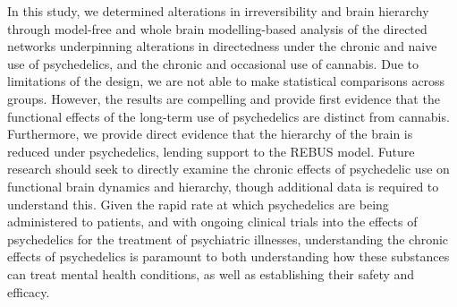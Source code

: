 In this study, we determined alterations
in irreversibility and brain hierarchy through
model-free and whole brain modelling-based analysis of the directed networks underpinning
alterations in directedness under the chronic and naive use of psychedelics, and the chronic and occasional use of cannabis. Due to limitations of the design, we are not able to make statistical comparisons across groups. However, the results
are compelling and provide first evidence
that the functional effects of the long-term
use of psychedelics are distinct from cannabis. Furthermore, we provide direct evidence that the hierarchy of the brain is reduced under psychedelics, lending support to the REBUS model. Future research should seek to directly examine
the chronic effects of psychedelic use on
functional brain dynamics and hierarchy, though
additional data is required to understand this.
Given the rapid rate at which psychedelics are being
administered to patients, and with ongoing clinical trials
into the effects of psychedelics for the treatment of psychiatric illnesses, understanding
the chronic effects of psychedelics is paramount to both understanding
how these substances can treat mental health conditions, as well as
establishing their safety and efficacy.